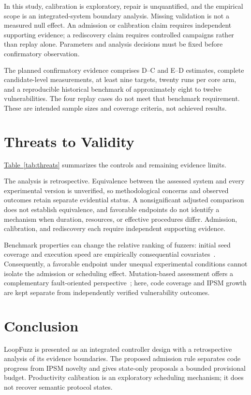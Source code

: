 \documentclass[final,5p,times,number]{elsarticle}
\newcommand{\namedref}[2]{\hyperref[#2]{#1~\ref*{#2}}}
\begin{document}
In this study, calibration is exploratory, repair is unquantified, and the empirical scope is an integrated-system boundary analysis. Missing validation is not a measured null effect. An admission or calibration claim requires independent supporting evidence; a rediscovery claim requires controlled campaigns rather than replay alone. Parameters and analysis decisions must be fixed before confirmatory observation.

The planned confirmatory evidence comprises D--C and E--D estimates, complete candidate-level measurements, at least nine targets, twenty runs per core arm, and a reproducible historical benchmark of approximately eight to twelve vulnerabilities. The four replay cases do not meet that benchmark requirement. These are intended sample sizes and coverage criteria, not achieved results.

\section{Threats to Validity}
\namedref{Table}{tab:threats} summarizes the controls and remaining evidence limits.
\label{sec:threats}


The analysis is retrospective. Equivalence between the assessed system and every experimental version is unverified, so methodological concerns and observed outcomes retain separate evidential status. A nonsignificant adjusted comparison does not establish equivalence, and favorable endpoints do not identify a mechanism when duration, resources, or effective procedures differ. Admission, calibration, and rediscovery each require independent supporting evidence.

Benchmark properties can change the relative ranking of fuzzers: initial seed coverage and execution speed are empirically consequential covariates~\cite{benchmarkproperties}. Consequently, a favorable endpoint under unequal experimental conditions cannot isolate the admission or scheduling effect. Mutation-based assessment offers a complementary fault-oriented perspective~\cite{mutationassessment2023}; here, code coverage and IPSM growth are kept separate from independently verified vulnerability outcomes.

\section{Conclusion}
LoopFuzz is presented as an integrated controller design with a retrospective analysis of its evidence boundaries. The proposed admission rule separates code progress from IPSM novelty and gives state-only proposals a bounded provisional budget. Productivity calibration is an exploratory scheduling mechanism; it does not recover semantic protocol states.
\end{document}
